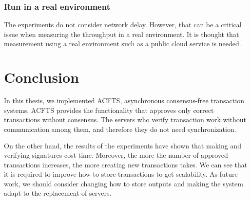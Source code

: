 \documentclass[a4paper, oneside]{discothesis}
\begin{document}
\subsection{Run in a real environment}
The experiments do not consider network delay.
However, that can be a critical issue when measuring the throughput in a real environment.
It is thought that measurement using a real environment such as a public cloud service is needed.


\chapter{Conclusion}
In this thesis, we implemented ACFTS, asynchronous consensus-free transaction systems.
ACFTS provides the functionality that approves only correct transactions without consensus.
The servers who verify transaction work without communication among them,
and therefore they do not need synchronization.

On the other hand, the results of the experiments have shown that
making and verifying signatures cost time.
Moreover, the more the number of approved transactions increases,
the more creating new transactions takes.
We can see that it is required to improve how to store transactions to get scalability.
As future work, we should consider changing how to store outputs
and making the system adapt to the replacement of servers.




\end{document}
